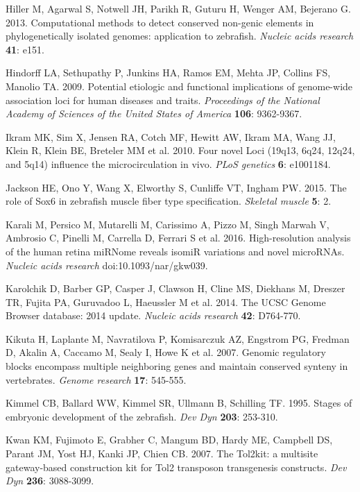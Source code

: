 \documentclass[]{article}
\begin{document}
\protect\hypertarget{_ENREF_7}{}{}Hiller M, Agarwal S, Notwell JH,
Parikh R, Guturu H, Wenger AM, Bejerano G. 2013. Computational methods
to detect conserved non-genic elements in phylogenetically isolated
genomes: application to zebrafish. \emph{Nucleic acids research}
\textbf{41}: e151.

\protect\hypertarget{_ENREF_8}{}{}Hindorff LA, Sethupathy P, Junkins HA,
Ramos EM, Mehta JP, Collins FS, Manolio TA. 2009. Potential etiologic
and functional implications of genome-wide association loci for human
diseases and traits. \emph{Proceedings of the National Academy of
Sciences of the United States of America} \textbf{106}: 9362-9367.

\protect\hypertarget{_ENREF_9}{}{}Ikram MK, Sim X, Jensen RA, Cotch MF,
Hewitt AW, Ikram MA, Wang JJ, Klein R, Klein BE, Breteler MM et al.
2010. Four novel Loci (19q13, 6q24, 12q24, and 5q14) influence the
microcirculation in vivo. \emph{PLoS genetics} \textbf{6}: e1001184.

\protect\hypertarget{_ENREF_10}{}{}Jackson HE, Ono Y, Wang X, Elworthy
S, Cunliffe VT, Ingham PW. 2015. The role of Sox6 in zebrafish muscle
fiber type specification. \emph{Skeletal muscle} \textbf{5}: 2.

\protect\hypertarget{_ENREF_11}{}{}Karali M, Persico M, Mutarelli M,
Carissimo A, Pizzo M, Singh Marwah V, Ambrosio C, Pinelli M, Carrella D,
Ferrari S et al. 2016. High-resolution analysis of the human retina
miRNome reveals isomiR variations and novel microRNAs. \emph{Nucleic
acids research} doi:10.1093/nar/gkw039.

\protect\hypertarget{_ENREF_12}{}{}Karolchik D, Barber GP, Casper J,
Clawson H, Cline MS, Diekhans M, Dreszer TR, Fujita PA, Guruvadoo L,
Haeussler M et al. 2014. The UCSC Genome Browser database: 2014 update.
\emph{Nucleic acids research} \textbf{42}: D764-770.

\protect\hypertarget{_ENREF_13}{}{}Kikuta H, Laplante M, Navratilova P,
Komisarczuk AZ, Engstrom PG, Fredman D, Akalin A, Caccamo M, Sealy I,
Howe K et al. 2007. Genomic regulatory blocks encompass multiple
neighboring genes and maintain conserved synteny in vertebrates.
\emph{Genome research} \textbf{17}: 545-555.

\protect\hypertarget{_ENREF_14}{}{}Kimmel CB, Ballard WW, Kimmel SR,
Ullmann B, Schilling TF. 1995. Stages of embryonic development of the
zebrafish. \emph{Dev Dyn} \textbf{203}: 253-310.

\protect\hypertarget{_ENREF_15}{}{}Kwan KM, Fujimoto E, Grabher C,
Mangum BD, Hardy ME, Campbell DS, Parant JM, Yost HJ, Kanki JP, Chien
CB. 2007. The Tol2kit: a multisite gateway-based construction kit for
Tol2 transposon transgenesis constructs. \emph{Dev Dyn} \textbf{236}:
3088-3099.
\end{document}
